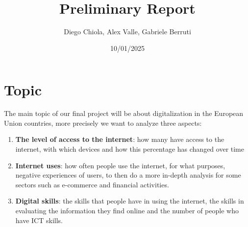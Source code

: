 \documentclass[12pt]{article}
\title{Preliminary Report}
\author{Diego Chiola, Alex Valle, Gabriele Berruti}
\date{10/01/2025}
\begin{document}
\maketitle
\newpage

\section{Topic}
The main topic of our final project will be about digitalization in the European
Union countries, more precisely we want to analyze three aspects:
\begin{enumerate}
    \item \textbf{The level of access to the internet}: how many have access to the
          internet, with which devices and how this percentage has changed over time
    \item \textbf{Internet uses}: how often people use the internet, for what purposes,
          negative experiences of users, to then do a more in-depth analysis for some
          sectors such as e-commerce and financial activities.
    \item \textbf{Digital skills}: the skills that people have in using the internet,
          the skills in evaluating the information they find online and the number
          of people who have ICT skills.
\end{enumerate}
\end{document}
